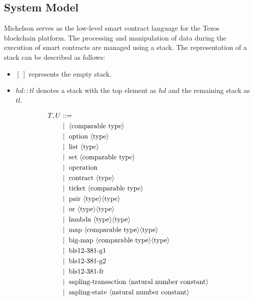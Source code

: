 \documentclass[a4paper,USenglish,cleveref, autoref, thm-restate]{lipics-v2021}
\begin{document}
\subsection{System Model}
Michelson serves as the low-level smart contract language for the Tezos blockchain platform. The processing and manipulation of data during the execution of smart contracts are managed using a stack. The representation of a stack can be described as follows:
\begin{itemize}
\item[]  \ensuremath{[\ ]} represents the empty stack.
\item[]  \ensuremath{hd :: tl} denotes a stack with the top element as \ensuremath{hd} and the remaining stack as \ensuremath{tl}.
\end{itemize}
\begin{figure} []
\begin{align*}
T, U &::= \\
   &\Mid\ \langle \text{comparable type}\rangle \\
   &\Mid\ \text{option}\ \langle\text{type}\rangle \\
   &\Mid\ \text{list}\ \langle\text{type}\rangle \\
   &\Mid\ \text{set}\ \langle\text{comparable type}\rangle \\
   &\Mid\ \text{operation} \\
   &\Mid\ \text{contract}\ \langle\text{type}\rangle \\
   &\Mid\ \text{ticket}\ \langle\text{comparable type}\rangle \\
   &\Mid\ \text{pair}\ \langle\text{type}\rangle \langle\text{type}\rangle \\
   &\Mid\ \text{or}\ \langle\text{type}\rangle \langle\text{type}\rangle \\
   &\Mid\ \text{lambda}\ \langle\text{type}\rangle \langle\text{type}\rangle \\
   &\Mid\ \text{map}\ \langle\text{comparable type}\rangle \langle\text{type}\rangle \\
   &\Mid\ \text{big-map}\ \langle\text{comparable type}\rangle \langle\text{type}\rangle \\
   &\Mid\ \text{bls12-381-g1} \\
   &\Mid\ \text{bls12-381-g2} \\
   &\Mid\ \text{bls12-381-fr} \\
   &\Mid\ \text{sapling-transaction}\ \langle\text{natural number constant}\rangle \\
   &\Mid\ \text{sapling-state}\ \langle\text{natural number constant}\rangle \\

\end{align*}
\end{figure}
\end{document}
